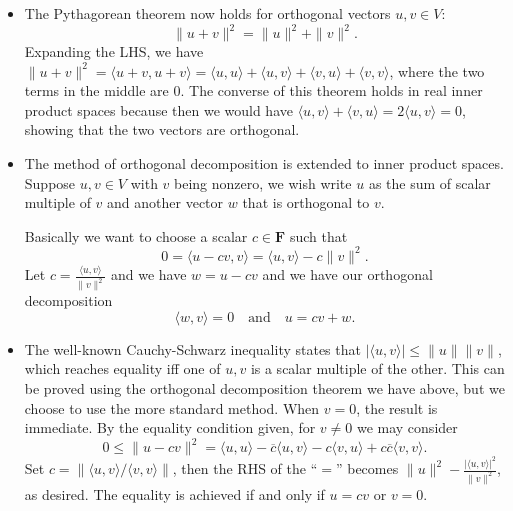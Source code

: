 \documentclass[11pt]{article}
\newcommand{\F}{\mathbf{F}}
\newcommand{\conj}[1]{\overline{#1}}
\newcommand{\inp}[2]{\langle #1, #2 \rangle}
\newcommand{\nm}[1]{\lVert #1 \rVert}
\newcommand{\abs}[1]{\lvert #1 \rvert}
\begin{document}
\begin{itemize}
\begin{itemize}
        \item The Pythagorean theorem now holds for orthogonal vectors $u,v \in V$: $$\|u+v\|^2 = \|u\|^2 + \|v\|^2.$$ Expanding the LHS, we have $\|u+v\|^2 = \inp{u+v}{u+v} = \inp{u}{u} + \inp{u}{v} + \inp{v}{u} + \inp{v}{v}$, where the two terms in the middle are 0.
        The converse of this theorem holds in real inner product spaces because then we would have $\inp{u}{v}+\inp{v}{u} = 2\inp{u}{v} = 0$, showing that the two vectors are orthogonal.
        \item The method of orthogonal decomposition is extended to inner product spaces. Suppose $u,v \in V$ with $v$ being nonzero, we wish write $u$ as the sum of scalar multiple of $v$ and another vector $w$ that is orthogonal to $v$.
        
        Basically we want to choose a scalar $c \in \F$ such that $$0 = \inp{u-cv}{v} = \inp{u}{v} - c\|v\|^2.$$ Let $c = \frac{\inp{u}{v}}{\|v\|^2}$ and we have $w = u - cv$ and we have our orthogonal decomposition $$\inp{w}{v} = 0 \quad \text{and} \quad u = cv+w.$$
        \item The well-known Cauchy-Schwarz inequality states that $\abs{\inp{u}{v}} \leq \|u\|\|v\|$, which reaches equality iff one of $u,v$ is a scalar multiple of the other. This can be proved using the orthogonal decomposition theorem we have above, but we choose to use the more standard method. When $v = 0$, the result is immediate. By the equality condition given, for $v \not= 0$ we may consider $$0 \leq \|u - cv\|^2 = \inp{u}{u} - \conj{c}\inp{u}{v} - c\inp{v}{u} + c\conj{c}\inp{v}{v}.$$ Set $c = \nm{\inp{u}{v}/\inp{v}{v}}$, then the RHS of the ``$=$'' becomes $ \nm{u}^2 - \frac{\abs{\inp{u}{v}}^2}{\nm{v}^2}$, as desired. The equality is achieved if and only if $u = cv$ or $v = 0$.
        

\end{itemize}
\end{itemize}
\end{document}
